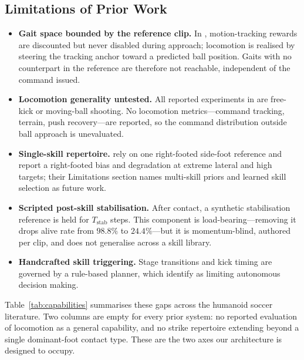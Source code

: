\documentclass{article}
\begin{document}
\subsection*{Limitations of Prior Work}
\begin{itemize}
  \item \textbf{Gait space bounded by the reference clip.} In \citet{robonaldo}, motion-tracking rewards are discounted but never disabled during approach; locomotion is realised by steering the tracking anchor toward a predicted ball position. Gaits with no counterpart in the reference are therefore not reachable, independent of the command issued.
  \item \textbf{Locomotion generality untested.} All reported experiments in \citep{robonaldo,paid,striker} are free-kick or moving-ball shooting. No locomotion metrics---command tracking, terrain, push recovery---are reported, so the command distribution outside ball approach is unevaluated.
  \item \textbf{Single-skill repertoire.} \citet{robonaldo} rely on one right-footed side-foot reference and report a right-footed bias and degradation at extreme lateral and high targets; their Limitations section names multi-skill priors and learned skill selection as future work.
  \item \textbf{Scripted post-skill stabilisation.} After contact, a synthetic stabilisation reference is held for $T_{\mathrm{stab}}$ steps. This component is load-bearing---removing it drops alive rate from $98.8\%$ to $24.4\%$---but it is momentum-blind, authored per clip, and does not generalise across a skill library.
  \item \textbf{Handcrafted skill triggering.} Stage transitions and kick timing are governed by a rule-based planner, which \citet{robonaldo} identify as limiting autonomous decision making.
\end{itemize}

Table~\ref{tab:capabilities} summarises these gaps across the humanoid soccer literature. Two columns are empty for every prior system: no reported evaluation of locomotion as a general capability, and no strike repertoire extending beyond a single dominant-foot contact type. These are the two axes our architecture is designed to occupy.
\end{document}
